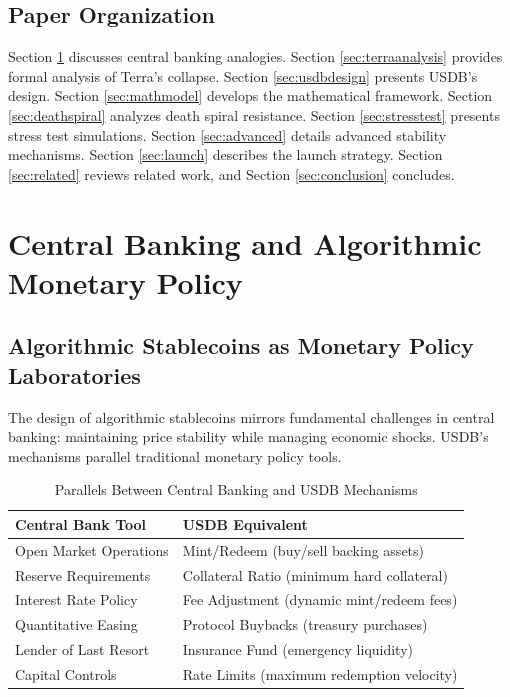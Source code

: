 \documentclass[11pt,a4paper]{article}
\begin{document}
\subsection{Paper Organization}

Section \ref{sec:cbanalogy} discusses central banking analogies. Section \ref{sec:terraanalysis} provides formal analysis of Terra's collapse. Section \ref{sec:usdbdesign} presents USDB's design. Section \ref{sec:mathmodel} develops the mathematical framework. Section \ref{sec:deathspiral} analyzes death spiral resistance. Section \ref{sec:stresstest} presents stress test simulations. Section \ref{sec:advanced} details advanced stability mechanisms. Section \ref{sec:launch} describes the launch strategy. Section \ref{sec:related} reviews related work, and Section \ref{sec:conclusion} concludes.

\section{Central Banking and Algorithmic Monetary Policy}
\label{sec:cbanalogy}

\subsection{Algorithmic Stablecoins as Monetary Policy Laboratories}

The design of algorithmic stablecoins mirrors fundamental challenges in central banking: maintaining price stability while managing economic shocks. USDB's mechanisms parallel traditional monetary policy tools.

\begin{table}[H]
\centering
\caption{Parallels Between Central Banking and USDB Mechanisms}
\begin{tabular}{@{}ll@{}}
\toprule
\textbf{Central Bank Tool} & \textbf{USDB Equivalent} \\ \midrule
Open Market Operations & Mint/Redeem (buy/sell backing assets) \\
Reserve Requirements & Collateral Ratio (minimum hard collateral) \\
Interest Rate Policy & Fee Adjustment (dynamic mint/redeem fees) \\
Quantitative Easing & Protocol Buybacks (treasury purchases) \\
Lender of Last Resort & Insurance Fund (emergency liquidity) \\
Capital Controls & Rate Limits (maximum redemption velocity) \\ \bottomrule
\end{tabular}
\end{table}
\end{document}

